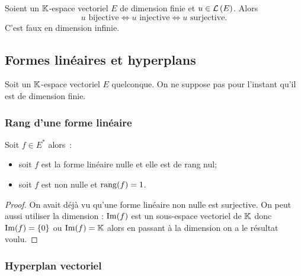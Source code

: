 \begin{corth}
  Soient un \(\mathbb{K}\)-espace vectoriel \(E\) de dimension finie et \(u \in 
  \mathcal{L}\left(E\right)\). Alors
  \begin{equation}
    u \text{~bijective} \iff u \text{~injective} \iff u \text{~surjective}.
  \end{equation}
  C'est faux en dimension infinie.
\end{corth}

\subsection{Formes linéaires et hyperplans}

Soit un \(\mathbb{K}\)-espace vectoriel \(E\) quelconque. On ne suppose pas pour 
l'instant qu'il est de dimension finie.

\subsubsection{Rang d'une forme linéaire}

\begin{prop}
  Soit \(f \in E^*\) alors~:
  \begin{itemize}
    \item soit \(f\) est la forme linéaire nulle et elle est de rang nul;
    \item soit \(f\) est non nulle et \(\operatorname{rang}(f)=1\).
  \end{itemize}
\end{prop}
\begin{proof}
  On avait déjà vu qu'une forme linéaire non nulle est surjective. On peut aussi 
  utiliser la dimension : \(\operatorname{Im}(f)\) est un sous-espace vectoriel de \(\mathbb{K}\) 
  donc \(\operatorname{Im}(f) = \{0\}\) ou \(\operatorname{Im}(f) = \mathbb{K}\) alors en passant à la 
  dimension on a le résultat voulu.
\end{proof}

\subsubsection{Hyperplan vectoriel}

